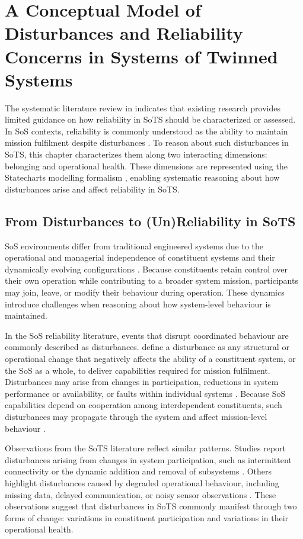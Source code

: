 \chapter{A Conceptual Model of Disturbances and Reliability Concerns in Systems of Twinned Systems}
\label{ch:reliable-sots}
The systematic literature review in  indicates that existing research provides limited guidance on how reliability in SoTS should be characterized or assessed. In SoS contexts, reliability is commonly understood as the ability to maintain mission fulfilment despite disturbances \cite{ferreira2023towards}. To reason about such disturbances in SoTS, this chapter characterizes them along two interacting dimensions: belonging and operational health. These dimensions are represented using the Statecharts modelling formalism \cite{harel1987statecharts}, enabling systematic reasoning about how disturbances arise and affect reliability in SoTS.

\section{From Disturbances to (Un)Reliability in SoTS}
SoS environments differ from traditional engineered systems due to the operational and managerial independence of constituent systems and their dynamically evolving configurations \cite{maier1998architecting}. Because constituents retain control over their own operation while contributing to a broader system mission, participants may join, leave, or modify their behaviour during operation. These dynamics introduce challenges when reasoning about how system-level behaviour is maintained.

In the SoS reliability literature, events that disrupt coordinated behaviour are commonly described as disturbances. \citet{ferreira2023towards} define a disturbance as any structural or operational change that negatively affects the ability of a constituent system, or the SoS as a whole, to deliver capabilities required for mission fulfilment. Disturbances may arise from changes in participation, reductions in system performance or availability, or faults within individual systems \cite{ferreira2023towards}. Because SoS capabilities depend on cooperation among interdependent constituents, such disturbances may propagate through the system and affect mission-level behaviour \cite{avizienis2004basic,li2025reliability}.

Observations from the SoTS literature reflect similar patterns. Studies report disturbances arising from changes in system participation, such as intermittent connectivity or the dynamic addition and removal of subsystems \cite{parri2019jarvis,human2023design,howard2021greenhouse}. Others highlight disturbances caused by degraded operational behaviour, including missing data, delayed communication, or noisy sensor observations \cite{esterle2021digital,gill2022method,chen2018digital,duan2023digital}. These observations suggest that disturbances in SoTS commonly manifest through two forms of change: variations in constituent participation and variations in their operational health.


